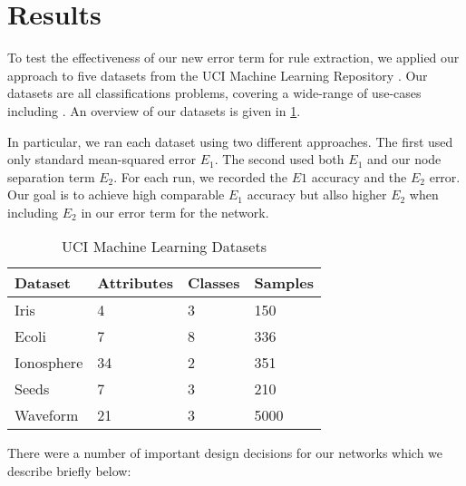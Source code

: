 \section{Results}
\label{sec:results}

To test the effectiveness of our new error term for rule extraction,
we applied our approach to five 
datasets from the UCI Machine Learning Repository \cite{uci}. Our
datasets are all classifications problems, covering a wide-range of
use-cases including
. An overview of our datasets is given in \ref{tab:datasets}.

In particular, we ran each dataset using two different approaches. The first
used only standard mean-squared error $E_1$. The second used both
$E_1$ and our node separation term $E_2$. For each run, we recorded
the $E1$ accuracy and the $E_2$ error. Our goal is to achieve
high comparable $E_1$ accuracy but allso higher $E_2$ when including
$E_2$ in our error term for the network.

\begin{table}[]
  \centering
\begin{tabular}{@{}llll@{}}
\toprule
Dataset    & Attributes & Classes & Samples \\ \midrule
Iris       & 4          & 3       & 150     \\
Ecoli      & 7          & 8       & 336     \\
Ionosphere & 34         & 2       & 351     \\
Seeds      & 7          & 3       & 210     \\
Waveform   & 21         & 3       & 5000    \\ \bottomrule
\end{tabular}
\caption{UCI Machine Learning Datasets }
\label{tab:datasets}
\end{table}

There were a number of important design decisions for our networks
which we describe briefly below:

